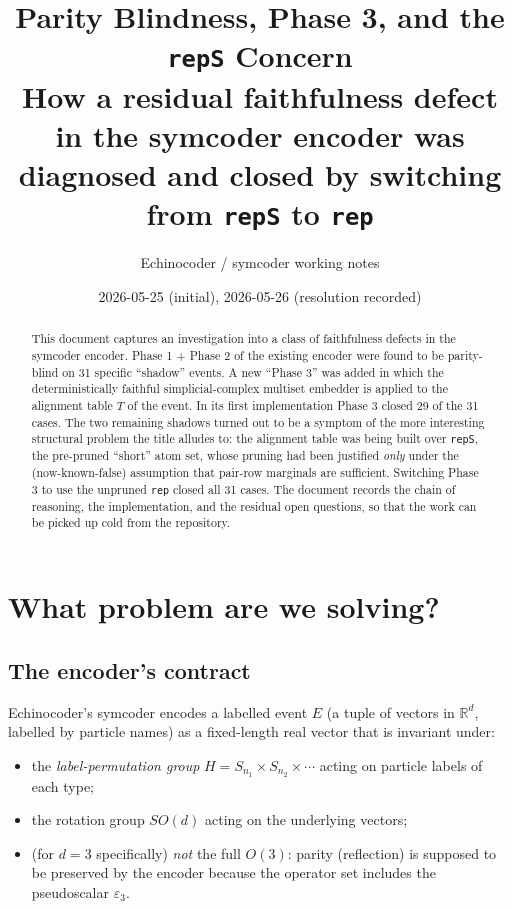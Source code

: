 \documentclass[a4paper,11pt]{article}
\title{Parity Blindness, Phase 3, and the \texttt{repS} Concern \\
       \large How a residual faithfulness defect in the symcoder encoder
               was diagnosed and closed by switching from \texttt{repS}
               to \texttt{rep}}
\author{Echinocoder / symcoder working notes}
\date{2026-05-25 (initial), 2026-05-26 (resolution recorded)}
\begin{document}
\maketitle

\begin{abstract}
This document captures an investigation into a class of faithfulness
defects in the symcoder encoder.  Phase 1 + Phase 2 of the existing
encoder were found to be parity-blind on 31 specific
``shadow'' events.  A new ``Phase 3'' was added in which the
deterministically faithful simplicial-complex multiset embedder is
applied to the alignment table $T$ of the event.  In its first
implementation Phase 3 closed 29 of the 31 cases.  The two remaining
shadows turned out to be a symptom of the more interesting structural
problem the title alludes to: the alignment table was being built over
\texttt{repS}, the pre-pruned ``short'' atom set, whose pruning had
been justified \emph{only} under the (now-known-false) assumption that
pair-row marginals are sufficient.  Switching Phase 3 to use the
unpruned \texttt{rep} closed all 31 cases.  The document records the
chain of reasoning, the implementation, and the residual open
questions, so that the work can be picked up cold from the repository.
\end{abstract}

\tableofcontents

\section{What problem are we solving?}

\subsection{The encoder's contract}
Echinocoder's symcoder encodes a labelled event $E$ (a tuple of vectors
in $\mathbb{R}^d$, labelled by particle names) as a fixed-length real
vector that is invariant under:
\begin{itemize}[nosep]
  \item the \emph{label-permutation group} $H = S_{n_1} \times S_{n_2}
        \times \cdots$ acting on particle labels of each type;
  \item the rotation group $SO(d)$ acting on the underlying vectors;
  \item (for $d=3$ specifically) \emph{not} the full $O(3)$: parity
        (reflection) is supposed to be preserved by the encoder because
        the operator set includes the pseudoscalar $\varepsilon_3$.
\end{itemize}
\end{document}
